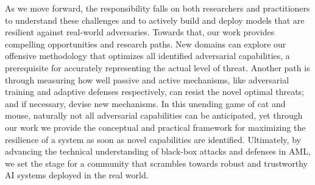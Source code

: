 As we move forward, the responsibility falls on both researchers and practitioners to understand these challenges and to actively build and deploy models that are resilient against real-world adversaries.
Towards that, our work provides compelling opportunities and research paths.
New domains can explore our offensive methodology that optimizes all identified adversarial capabilities, a prerequisite for accurately representing the actual level of threat.
Another path is through measuring how well passive and active mechanisms, like adversarial training and adaptive defenses respectively, can resist the novel optimal threats; and if necessary, devise new mechanisms.
In this unending game of cat and mouse, naturally not all adversarial capabilities can be anticipated, yet through our work we provide the conceptual and practical framework for maximizing the resilience of a system as soon as novel capabilities are identified.
Ultimately, by advancing the technical understanding of black-box attacks and defenses in \gls{AML}, we set the stage for a community that scrambles towards robust and trustworthy \gls{AI} systems deployed in the real world.





\cleardoublepage